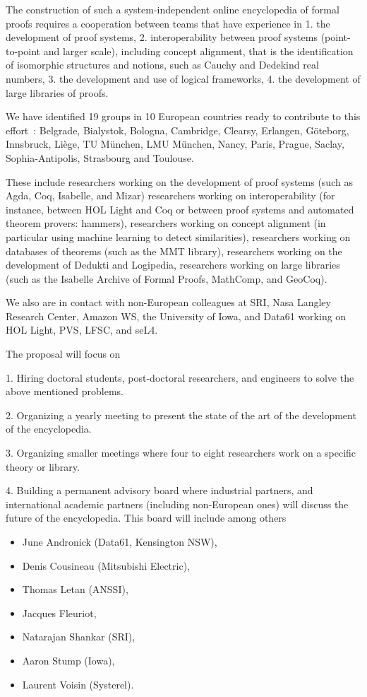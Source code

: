 The construction of such a system-independent online encyclopedia of formal proofs requires a cooperation between teams that have experience in
1. the development of proof systems,
2. interoperability between proof systems (point-to-point and larger scale), including concept alignment, that is the identification of isomorphic structures and notions, such as Cauchy and Dedekind real numbers,
3. the development and use of logical frameworks,
4. the development of large libraries of proofs.

We have identified 19 groups in 10 European countries ready to
contribute to this effort~: Belgrade, Bialystok, Bologna, Cambridge, Clearsy, Erlangen, G\"oteborg, Innsbruck, Liège, TU München, LMU München, Nancy, Paris, Prague, Saclay, Sophia-Antipolis, Strasbourg and Toulouse.

These include researchers working on the development of proof systems
(such as Agda, Coq, Isabelle, and Mizar) researchers working on
interoperability (for instance, between HOL Light and Coq or between
proof systems and automated theorem provers: hammers), researchers
working on concept alignment (in particular using machine learning to
detect similarities), researchers working on databases of theorems
(such as the MMT library), researchers working on the development of
Dedukti and Logipedia, researchers working on large libraries (such as
the Isabelle Archive of Formal Proofs, MathComp, and GeoCoq).


We also are in contact with non-European colleagues at SRI, Nasa
Langley Research Center, Amazon WS, the University of Iowa, and Data61
working on HOL Light, PVS, LFSC, and seL4.

The proposal will focus on

1. Hiring doctoral students, post-doctoral researchers, and engineers to solve the above mentioned problems.

2. Organizing a yearly meeting to present the state of the art of the development of the encyclopedia.

3. Organizing smaller meetings where four to eight researchers work on a specific theory or library.

4. Building a permanent advisory board where industrial partners, and
international academic partners (including non-European ones) will
discuss the future of the encyclopedia. This board will include among
others 
\begin{itemize}
\item June Andronick (Data61, Kensington NSW), 
\item Denis Cousineau (Mitsubishi Electric), 
\item Thomas Letan (ANSSI), 
\item Jacques Fleuriot, 
\item Natarajan Shankar (SRI),
\item Aaron Stump (Iowa), 
\item Laurent Voisin (Systerel).
\end{itemize}


